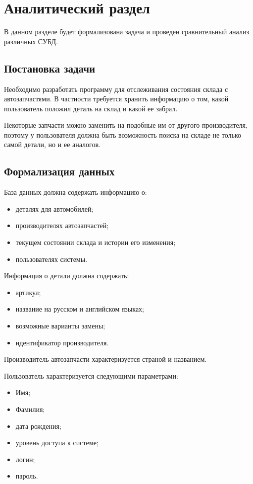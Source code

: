 \chapter{Аналитический раздел}

В данном разделе будет формализована задача и проведен сравнительный анализ различных СУБД.

\section{Постановка задачи}
Необходимо разработать программу для отслеживания состояния склада с автозапчастями. В частности требуется хранить информацию о том, какой пользователь положил деталь на склад и какой ее забрал.

Некоторые запчасти можно заменить на подобные им от другого производителя, поэтому у пользователя должна быть возможность поиска на складе не только самой детали, но и ее аналогов.

\section{Формализация данных}
База данных должна содержать информацию о:
\begin{itemize}
	\item деталях для автомобилей;
	\item производителях автозапчастей;
	\item текущем состоянии склада и истории его изменения;
	\item пользователях системы.
\end{itemize}

Информация о детали должна содержать:
\begin{itemize}
	\item артикул;
	\item название на русском и английском языках;
	\item возможные варианты замены;
	\item идентификатор производителя.
\end{itemize}

Производитель автозапчасти характеризуется страной и названием.

Пользователь характеризуется следующими параметрами:
\begin{itemize}
	\item Имя;
	\item Фамилия;
	\item дата рождения;
	\item уровень доступа к системе;
	\item логин;
	\item пароль.
\end{itemize}


